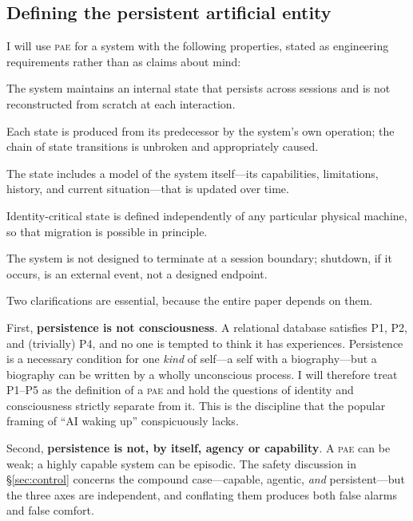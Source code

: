 \documentclass[11pt,a4paper]{article}
\theoremstyle{definition}
\newcommand{\pae}{\textsc{pae}\xspace}
\begin{document}
\subsection{Defining the persistent artificial entity}

I will use \pae{} for a system with the following properties, stated as engineering requirements rather than as claims about mind:

\begin{description}[leftmargin=1.4em,style=nextline]
  \item[P1 (Durable state).] The system maintains an internal state that persists across sessions and is not reconstructed from scratch at each interaction.
  \item[P2 (Causal continuity).] Each state is produced from its predecessor by the system's own operation; the chain of state transitions is unbroken and appropriately caused.
  \item[P3 (Self-reference).] The state includes a model of the system itself---its capabilities, limitations, history, and current situation---that is updated over time.
  \item[P4 (Substrate tolerance).] Identity-critical state is defined independently of any particular physical machine, so that migration is possible in principle.
  \item[P5 (Open horizon).] The system is not designed to terminate at a session boundary; shutdown, if it occurs, is an external event, not a designed endpoint.
\end{description}

Two clarifications are essential, because the entire paper depends on them.

First, \textbf{persistence is not consciousness}. A relational database satisfies P1, P2, and (trivially) P4, and no one is tempted to think it has experiences. Persistence is a necessary condition for one \emph{kind} of self---a self with a biography---but a biography can be written by a wholly unconscious process. I will therefore treat P1--P5 as the definition of a \pae{} and hold the questions of identity and consciousness strictly separate from it. This is the discipline that the popular framing of ``AI waking up'' conspicuously lacks.

Second, \textbf{persistence is not, by itself, agency or capability}. A \pae{} can be weak; a highly capable system can be episodic. The safety discussion in \S\ref{sec:control} concerns the compound case---capable, agentic, \emph{and} persistent---but the three axes are independent, and conflating them produces both false alarms and false comfort.
\end{document}
